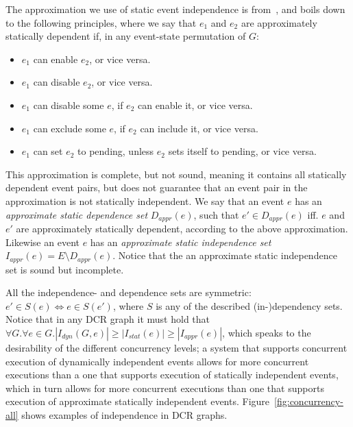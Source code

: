 \documentclass{article}
\begin{document}
			The approximation we use of static event independence is from~\cite{debois_concurrency_2015}, and boils down to the following principles, where we say that $e_1$ and $e_2$ are approximately statically dependent if, in any event-state permutation of $G$:
			\begin{itemize}
				\item $e_1$ can enable $e_2$, or vice versa.
				\item $e_1$ can disable $e_2$, or vice versa.
				\item $e_1$ can disable some $e$, if $e_2$ can enable it, or vice versa.
				\item $e_1$ can exclude some $e$, if $e_2$ can include it, or vice versa.
				\item $e_1$ can set $e_2$ to pending, unless $e_2$ sets itself to pending, or vice versa.
			\end{itemize}
			This approximation is complete, but not sound, meaning it contains all statically dependent event pairs, but does not guarantee that an event pair in the approximation is not statically independent.
			We say that an event $e$ has an \textit{approximate static dependence set} $D_{appr}(e)$, such that $e' \in D_{appr}(e)$ iff. $e$ and $e'$ are approximately statically dependent, according to the above approximation.
			Likewise an event $e$ has an \textit{approximate static independence set} $I_{appr}(e)  = E \setminus D_{appr}(e)$.
			Notice that the an approximate static independence set is sound but incomplete.

			All the independence- and dependence sets are symmetric: $e' \in S(e) \iff e \in S(e')$, where $S$ is any of the described (in-)dependency sets.
			Notice that in any DCR graph it must hold that $\forall G. \forall e\in G. |I_{dyn}(G,e)| \geq |I_{stat}(e)| \geq |I_{appr}(e)|$, which speaks to the desirability of the different concurrency levels; a system that supports concurrent execution of dynamically independent events allows for more concurrent executions than a one that supports execution of statically independent events, which in turn allows for more concurrent executions than one that supports execution of approximate statically independent events.
			Figure~\ref{fig:concurrency-all} shows examples of independence in DCR graphs.
\end{document}
